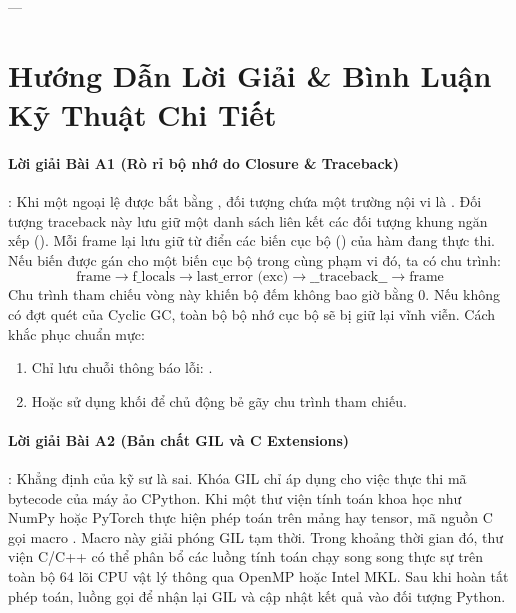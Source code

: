---

\section{Hướng Dẫn Lời Giải \& Bình Luận Kỹ Thuật Chi Tiết}
\label{sec:ch02-solutions}

\paragraph{Lời giải Bài A1 (Rò rỉ bộ nhớ do Closure \& Traceback)}:
Khi một ngoại lệ được bắt bằng , đối tượng  chứa một trường nội vi là . Đối tượng traceback này lưu giữ một danh sách liên kết các đối tượng khung ngăn xếp (). Mỗi frame lại lưu giữ từ điển các biến cục bộ () của hàm đang thực thi. Nếu biến  được gán cho một biến cục bộ trong cùng phạm vi đó, ta có chu trình:
\begin{equation*}
\text{frame} \longrightarrow \text{f\_locals} \longrightarrow \text{last\_error (exc)} \longrightarrow \text{\_\_traceback\_\_} \longrightarrow \text{frame}
\end{equation*}
Chu trình tham chiếu vòng này khiến bộ đếm  không bao giờ bằng 0. Nếu không có đợt quét của Cyclic GC, toàn bộ bộ nhớ cục bộ sẽ bị giữ lại vĩnh viễn. Cách khắc phục chuẩn mực:
\begin{enumerate}
  \item Chỉ lưu chuỗi thông báo lỗi: .
  \item Hoặc sử dụng khối  để chủ động bẻ gãy chu trình tham chiếu.
\end{enumerate}

\paragraph{Lời giải Bài A2 (Bản chất GIL và C Extensions)}:
Khẳng định của kỹ sư là sai. Khóa GIL chỉ áp dụng cho việc thực thi mã bytecode của máy ảo CPython. Khi một thư viện tính toán khoa học như NumPy hoặc PyTorch thực hiện phép toán trên mảng hay tensor, mã nguồn C gọi macro . Macro này giải phóng GIL tạm thời. Trong khoảng thời gian đó, thư viện C/C++ có thể phân bổ các luồng tính toán chạy song song thực sự trên toàn bộ $64$ lõi CPU vật lý thông qua OpenMP hoặc Intel MKL. Sau khi hoàn tất phép toán, luồng gọi  để nhận lại GIL và cập nhật kết quả vào đối tượng Python.

